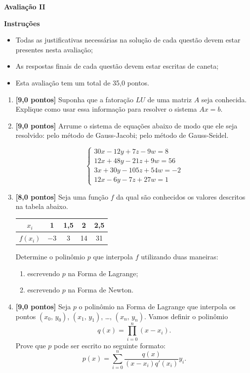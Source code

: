 \documentclass[12pt,a4paper]{article}
\begin{document}
\begin{center}
 \textbf{Avaliação II}
\end{center}

\textbf{Instruções}
\begin{itemize}
 \item Todas as justificativas necessárias na solução de cada questão devem 
 estar presentes nesta avaliação;
 \item As respostas finais de cada questão devem estar escritas de caneta;
 \item Esta avaliação tem um total de 35,0 pontos.
\end{itemize}

\begin{enumerate}
  \item \textbf{[9,0 pontos]} Suponha que a fatoração $LU$ de uma matriz $A$ seja conhecida.
  Explique como usar essa informação para resolver o sistema $Ax = b$. 

  \item \textbf{[9,0 pontos]} Arrume o sistema de equações abaixo de modo que ele seja
  resolvido: pelo método de Gauss-Jacobi; pelo método de Gauss-Seidel.

  $$
   \begin{cases}
    30x - 12y + 7z - 9w = 8 \\
    12x + 48y - 21z + 9w = 56 \\
    3x + 30y - 105z + 54w = -2 \\
    12x - 6y - 7z + 27w = 1
   \end{cases}
  $$

  \item \textbf{[8,0 pontos]} Seja uma função $f$ da qual são conhecidos os valores descritos na
  tabela abaixo.
  \begin{center}
    \begin{tabular}{c|c|c|c|c}
      $x_i$ & 1 & 1,5 & 2 & 2,5\\ \hline
      $f(x_i)$ & $-3$ & 3 & 14 & 31
    \end{tabular}
  \end{center}

  Determine o polinômio $p$ que interpola $f$ utilizando duas maneiras:
  \begin{enumerate}
   \item escrevendo $p$ na Forma de Lagrange;
   \item escrevendo $p$ na Forma de Newton.
  \end{enumerate}

  \item \textbf{[9,0 pontos]} Seja $p$ o polinômio na Forma de Lagrange que interpola os pontos
  $(x_0,\,y_0)$, $(x_1,\,y_1)$, \ldots, $(x_n,\,y_n)$. Vamos definir o polinômio
  $$q(x) = \prod_{i=0}^{n} (x-x_i).$$ Prove que $p$ pode ser escrito no seguinte
  formato: 
  $$p(x) = \sum_{i=0}^n\frac{q(x)}{(x-x_i)q'(x_i)}y_i.$$
\end{enumerate}
\end{document}
